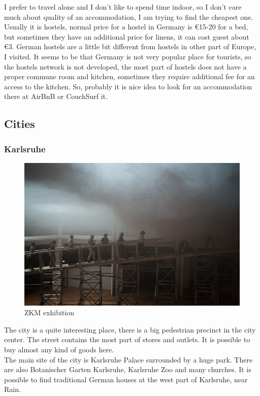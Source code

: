 \documentclass[english]{article}
\begin{document}
I prefer to travel alone and I don't like to spend time indoor, so I don't care much about quality of an accommodation, I am trying to find the cheapest one. Usually it is hostels, normal price for a hostel in Germany is \euro15-20 for a bed, but sometimes they have an additional price for linens, it can cost guest about \euro3. German hostels are a little bit different from hostels in other part of Europe, I visited. It seems to be that Germany is not very popular place for tourists, so the hostels network is not developed, the most part of hostels does not have a proper commune room and kitchen, sometimes they require additional fee for an access to the kitchen. So, probably it is nice idea to look for an accommodation there at AirBnB or CouchSurf it.

\subsection{Cities}
\subsubsection{Karlsruhe}

\begin{figure}
\centerline{\includegraphics[scale=0.5]{Germany_travel/zkm}}
\caption{ZKM exhibition}
\end{figure}


The city is a quite interesting place, there is a big pedestrian precinct in the city center. The street contains the most part of stores and outlets. It is possible to buy almost any kind of goods here.\\

The main site of the city is Karlsruhe Palace surrounded by a huge park. There are also Botanischer Garten Karlsruhe, Karlsruhe Zoo and many churches. It is possible to find traditional German houses at the west part of Karlsruhe, near Rain.\\
\end{document}
